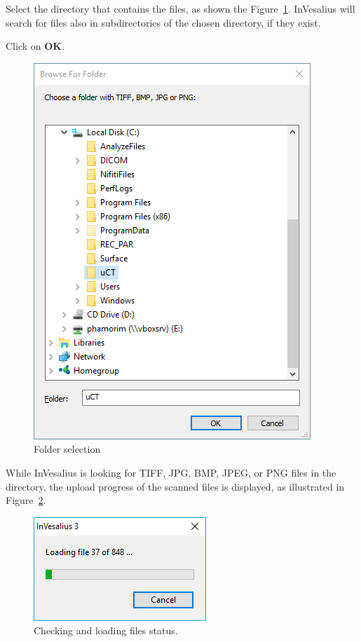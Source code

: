 Select the directory that contains the files, as shown the Figure~\ref{fig:import_bmp_select_folder}. InVesalius will search for files also in subdirectories of the chosen directory, if they exist. 

Click on \textbf{OK}.

\begin{figure}[!htb]
\centering
\includegraphics[scale=0.5]{../user_guide_figures/invesalius_screen/import_bmp_select_folder_en.png}
\caption{Folder selection}
\label{fig:import_bmp_select_folder}
\end{figure}

While InVesalius is looking for TIFF, JPG, BMP, JPEG, or PNG files in the directory, the upload progress of the scanned files is displayed, as illustrated in Figure~\ref{fig:import_bmp_load_pt}.

\begin{figure}[!htb]
\centering
\includegraphics[scale=0.6]{../user_guide_figures/invesalius_screen/import_bmp_load_en.png}
\caption{Checking and loading files status.}
\label{fig:import_bmp_load_pt}
\end{figure}

